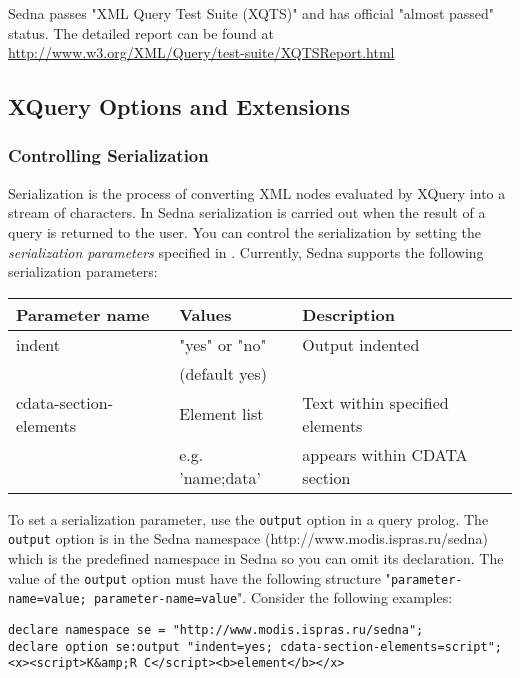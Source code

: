 \documentclass[a4paper,12pt]{article}
\begin{document}
Sedna passes "XML Query Test Suite (XQTS)" and has official "almost passed"
status. The detailed report can be found at
\url{http://www.w3.org/XML/Query/test-suite/XQTSReport.html}


\subsection{XQuery Options and Extensions}
\label{sec:xquery-extensions}

\subsubsection{Controlling Serialization}
\label{indents}
Serialization is the process of converting XML nodes evaluated by XQuery into a
stream of characters. In Sedna serialization is carried out when the result of a
query is returned to the user. You can control the serialization by setting the
\emph{serialization parameters} specified in \cite{paper:query-serialization}.
Currently, Sedna supports the following serialization parameters:

\medskip

\begin{tabular}{|l|l|l|}
\hline
Parameter name & Values & Description \\
\hline
\hline
indent & "yes" or "no" & Output indented \\
  & (default yes) & \\
\hline
cdata-section-elements & Element list & Text within specified elements \\
 & e.g. 'name;data' & appears within CDATA section \\
\hline
\end{tabular}

\medskip

To set a serialization parameter, use the \verb!output! option in a query
prolog. The \verb!output! option is in the Sedna namespace
(http://www.modis.ispras.ru/sedna) which is the predefined namespace in Sedna so
you can omit its declaration. The value of the \verb!output! option must have
the following structure "\verb!parameter-name=value; parameter-name=value!".
Consider the following examples:

\begin{verbatim}
declare namespace se = "http://www.modis.ispras.ru/sedna";
declare option se:output "indent=yes; cdata-section-elements=script";
<x><script>K&amp;R C</script><b>element</b></x>
\end{verbatim}
\end{document}

